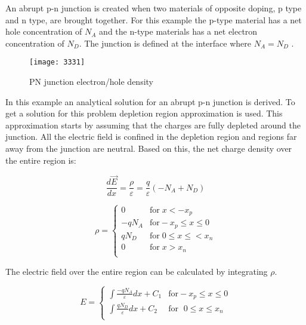 \begin{doublespace}
 An abrupt p-n junction is created when two materials of opposite doping, p type and n type, are brought together. For this example the p-type material has a net hole concentration of $N_{A}$ and the n-type materials has a net electron concentration of $N_{D}$. The junction is defined at the interface where $N_A=N_D$ \cite{Physem}. 

\begin{figure}[!htp]
\centering
\texttt{[image: 3331]}
\caption{PN junction electron/hole density} 
\end{figure}

In this example an analytical solution for an abrupt p-n junction is derived. To get a solution for this problem depletion region approximation is used. This approximation starts by assuming that the charges are fully depleted around the junction\cite{Physem}. All the electric field is confined in the depletion region and regions far away from the junction are neutral. Based on this, the net charge density over the entire region is:

\begin{equation}
\frac{d \vec{E} }{dx}=\frac{\rho}{\varepsilon}=\frac{q}{\varepsilon}(-N_{A}+N_{D})
\end{equation}

\begin{equation}
\rho = \begin{cases}
         0 & \text{for} \;  x<-x_{p}\\
       -qN_{A} & \text{for}  -x_{p}\leq x \leq 0 \\
        qN_{D} & \text{for} \; 0 \leq x \leq< x_{n}  \\
        0 & \text{for}\;  x>x_{n} \\
     \end{cases}
\end{equation}

The electric field over the entire region can be calculated by integrating $\rho$.

\begin{equation}
E = \begin{cases}
       \int \frac{-qN_{A}}{\varepsilon}  dx+ C_{1} & \text{for}  -x_{p}\leq x \leq 0 \\
       \int \frac{qN_{D}}{\varepsilon} dx+ C_{2}   & \text{for } \; 0 \leq x \leq x_{n}  \\
     \end{cases}
\end{equation}


\end{doublespace}
